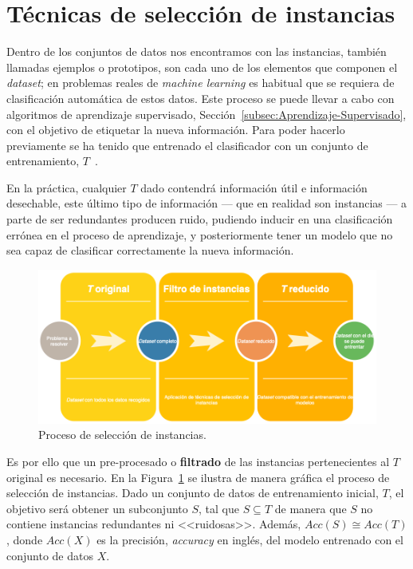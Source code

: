 \section{Técnicas de selección de instancias}\label{sec:tecnicas-seleccion-instancias}
Dentro de los conjuntos de datos nos encontramos con las instancias, también llamadas ejemplos o prototipos, son cada uno de los elementos que componen el \textit{dataset}; en problemas reales de \textit{machine learning} es habitual que se requiera de clasificación automática de estos datos. Este proceso se puede llevar a cabo con algoritmos de aprendizaje supervisado, Sección~\ref{subsec:Aprendizaje-Supervisado}, con el objetivo de etiquetar la nueva información. Para poder hacerlo previamente se ha tenido que entrenado el clasificador con un conjunto de entrenamiento, $T$~\cite{olvera2010review}.

En la práctica, cualquier $T$ dado contendrá información útil e información desechable, este último tipo de información --- que en realidad son instancias --- a parte de ser redundantes producen ruido, pudiendo inducir en una clasificación errónea en el proceso de aprendizaje, y posteriormente tener un modelo que no sea capaz de clasificar correctamente la nueva información.

\begin{figure}
\centering
\includegraphics[width=\linewidth]{../img/memoria/Instance-Selection-Overview}
\caption{Proceso de selección de instancias.}
\label{fig:instance-election-overview}
\end{figure}

Es por ello que un pre-procesado o \textbf{filtrado} de las instancias pertenecientes al $T$ original es necesario. En la Figura~\ref{fig:instance-election-overview} se ilustra de manera gráfica el proceso de selección de instancias. Dado un conjunto de datos de entrenamiento inicial, $T$, el objetivo será obtener un subconjunto $S$, tal que $S \subseteq T$ de manera que $S$ no contiene instancias redundantes ni <<ruidosas>>. Además, $Acc(S) \cong Acc(T)$, donde $Acc(X)$ es la precisión, \textit{accuracy} en inglés, del modelo entrenado con el conjunto de datos $X$.

